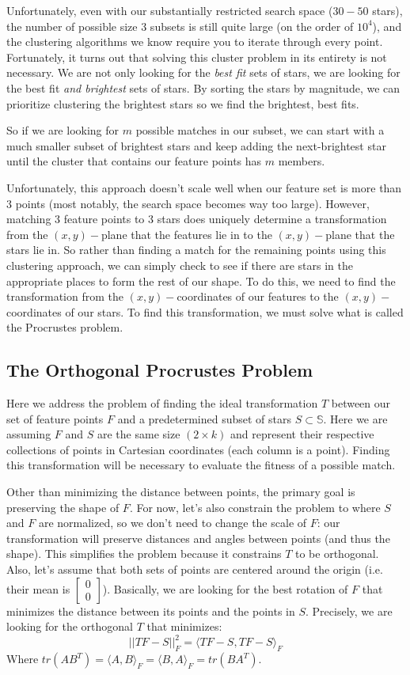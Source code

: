 \documentclass[paper=a4, fontsize=11pt]{scrartcl} %
\begin{document}
Unfortunately, even with our substantially restricted search space ($30-50$ stars), the number of possible size 3 subsets is still quite large (on the order of $10^4$), and the clustering algorithms we know require you to iterate through every point. Fortunately, it turns out that solving this cluster problem in its entirety is not necessary. We are not only looking for the \textit{best fit} sets of stars, we are looking for the best fit \textit{and brightest} sets of stars. By sorting the stars by magnitude, we can prioritize clustering the brightest stars so we find the brightest, best fits.

So if we are looking for $m$ possible matches in our subset, we can start with a much smaller subset of brightest stars and keep adding the next-brightest star until the cluster that contains our feature points has $m$ members.

Unfortunately, this approach doesn't scale well when our feature set is more than 3 points (most notably, the search space becomes way too large). However, matching 3 feature points to 3 stars does uniquely determine a transformation from the $(x,y)-$plane that the features lie in to the $(x,y)-$plane that the stars lie in. So rather than finding a match for the remaining points using this clustering approach, we can simply check to see if there are stars in the appropriate places to form the rest of our shape. To do this, we need to find the transformation from the $(x,y)-$coordinates of our features to the $(x,y)-$coordinates of our stars. To find this transformation, we must solve what is called the Procrustes problem.

\subsection{The Orthogonal Procrustes Problem}
Here we address the problem of finding the ideal transformation $T$ between our set of feature points $F$ and a predetermined subset of stars $S\subset \mathbb{S}$. Here we are assuming $F$ and $S$ are the same size $(2\times k)$ and represent their respective collections of points in Cartesian coordinates (each column is a point).  Finding this transformation will be necessary to evaluate the fitness of a possible match.

Other than minimizing the distance between points, the primary goal is preserving the shape of $F$. For now, let's also constrain the problem to where $S$ and $F$ are normalized, so we don't need to change the scale of $F$: our transformation will preserve distances and angles between points (and thus the shape). This simplifies the problem because it constrains $T$ to be orthogonal. Also, let's assume that both sets of points are centered around the origin (i.e. their mean is $\begin{bmatrix}
0\\
0
\end{bmatrix}$). Basically, we are looking for the best rotation of $F$ that minimizes the distance between its points and the points in $S$. Precisely, we are looking for the orthogonal $T$ that minimizes: 
$$||TF-S||^2_F = \langle TF-S, TF-S\rangle_F$$
Where $tr(AB^T) = \langle A,B\rangle_F = \langle B,A\rangle_F = tr(BA^T)$.
\end{document}
